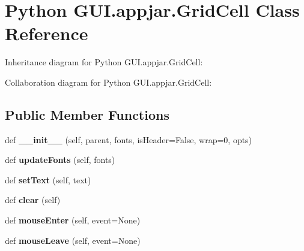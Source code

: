 \hypertarget{class_python_01_g_u_i_1_1appjar_1_1_grid_cell}{}\section{Python G\+U\+I.\+appjar.\+Grid\+Cell Class Reference}
\label{class_python_01_g_u_i_1_1appjar_1_1_grid_cell}


Inheritance diagram for Python G\+U\+I.\+appjar.\+Grid\+Cell\+:


Collaboration diagram for Python G\+U\+I.\+appjar.\+Grid\+Cell\+:
\subsection*{Public Member Functions}
\begin{DoxyCompactItemize}
\item 
\mbox{\label{class_python_01_g_u_i_1_1appjar_1_1_grid_cell_aa7e4773472687721b966bdebe2dd404c}} 
def {\bfseries \+\_\+\+\_\+init\+\_\+\+\_\+} (self, parent, fonts, is\+Header=False, wrap=0, opts)
\item 
\mbox{\label{class_python_01_g_u_i_1_1appjar_1_1_grid_cell_adca1d17e25af7ad2a352e2fc4ab0a287}} 
def {\bfseries update\+Fonts} (self, fonts)
\item 
\mbox{\label{class_python_01_g_u_i_1_1appjar_1_1_grid_cell_ab6a57b6278048ed2591231eb1c2a6811}} 
def {\bfseries set\+Text} (self, text)
\item 
\mbox{\label{class_python_01_g_u_i_1_1appjar_1_1_grid_cell_af51c58c643aa31876cd7a6c47360dc58}} 
def {\bfseries clear} (self)
\item 
\mbox{\label{class_python_01_g_u_i_1_1appjar_1_1_grid_cell_a9624481664e500f9d8f85c30df000823}} 
def {\bfseries mouse\+Enter} (self, event=None)
\item 
\mbox{\label{class_python_01_g_u_i_1_1appjar_1_1_grid_cell_a5206e9e943e91904c010f408946f0dab}} 
def {\bfseries mouse\+Leave} (self, event=None)

\end{DoxyCompactItemize}
